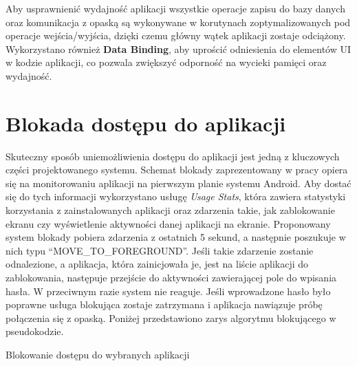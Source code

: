 \newline\newline
\indent Aby usprawnienić wydajność aplikacji wszystkie operacje zapisu do bazy danych oraz komunikacja z opaską są wykonywane w korutynach zoptymalizowanych pod operacje wejścia/wyjścia, dzięki czemu główny wątek aplikacji zostaje odciążony. Wykorzystano również \textbf{Data Binding}, aby uprościć odniesienia do elementów UI w kodzie aplikacji, co pozwala zwiększyć odporność na wycieki pamięci oraz wydajność. 

\section{Blokada dostępu do aplikacji}
Skuteczny sposób uniemożliwienia dostępu do aplikacji jest jedną z kluczowych części projektowanego systemu. Schemat blokady zaprezentowany w pracy opiera się na monitorowaniu aplikacji na pierwszym planie systemu Android. Aby dostać się do tych informacji wykorzystano usługę \textit{Usage Stats}, która zawiera statystyki korzystania z zainstalowanych aplikacji oraz zdarzenia takie, jak zablokowanie ekranu czy wyświetlenie aktywności danej aplikacji na ekranie. Proponowany system blokady pobiera zdarzenia z ostatnich 5 sekund, a następnie poszukuje w nich typu ``MOVE\_TO\_FOREGROUND''. Jeśli takie zdarzenie zostanie odnalezione, a aplikacja, która zainicjowała je, jest na liście aplikacji do zablokowania, następuje przejście do aktywności zawierającej pole do wpisania hasła. W przeciwnym razie system nie reaguje. Jeśli wprowadzone hasło było poprawne usługa blokująca zostaje zatrzymana i aplikacja nawiązuje próbę połączenia się z opaską. Poniżej przedstawiono zarys algorytmu blokującego w pseudokodzie.
\newline

\begin{algorithm}[H]
    \DontPrintSemicolon
    \SetAlgoLined
    \caption{Blokowanie dostępu do wybranych aplikacji} 
    \BlankLine
    \BlankLine
\end{algorithm}

